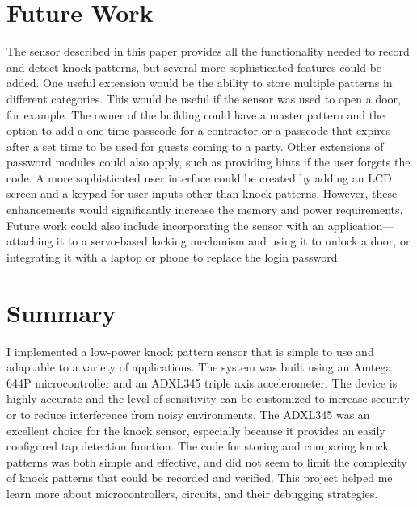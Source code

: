 \documentclass[conference]{./IEEEtran}
\begin{document}
\section{Future Work}
The sensor described in this paper provides all the functionality needed to record and detect knock patterns, but several more sophisticated features could be added. One useful extension would be the ability to store multiple patterns in different categories. This would be useful if the sensor was used to open a door, for example. The owner of the building could have a master pattern and the option to add a one-time passcode for a contractor or a passcode that expires after a set time to be used for guests coming to a party. Other extensions of password modules could also apply, such as providing hints if the user forgets the code. A more sophisticated user interface could be created by adding an LCD screen and a keypad for user inputs other than knock patterns. However, these enhancements would significantly increase the memory and power requirements. Future work could also include incorporating the sensor with an application---attaching it to a servo-based locking mechanism and using it to unlock a door, or integrating it with a laptop or phone to replace the login password. 

\section{Summary}
I implemented a low-power knock pattern sensor that is simple to use and adaptable to a variety of applications. The system was built using an Amtega 644P microcontroller and an ADXL345 triple axis accelerometer. The device is highly accurate and the level of sensitivity can be customized to increase security or to reduce interference from noisy environments. The ADXL345 was an excellent choice for the knock sensor, especially because it provides an easily configured tap detection function. The code for storing and comparing knock patterns was both simple and effective, and did not seem to limit the complexity of knock patterns that could be recorded and verified. This project helped me learn more about microcontrollers, circuits, and their debugging strategies. 





\end{document}
